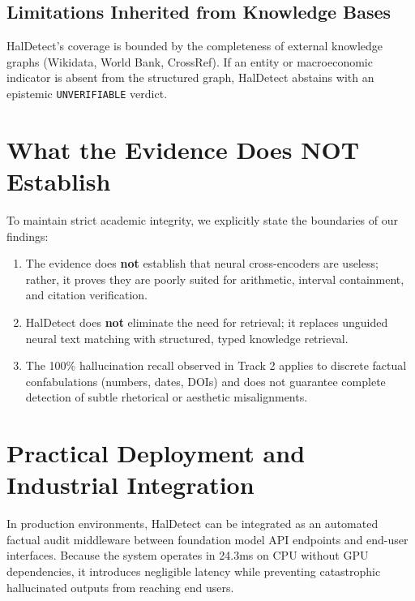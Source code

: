 \subsection{Limitations Inherited from Knowledge Bases}
HalDetect's coverage is bounded by the completeness of external knowledge graphs (Wikidata, World Bank, CrossRef). If an entity or macroeconomic indicator is absent from the structured graph, HalDetect abstains with an epistemic \texttt{UNVERIFIABLE} verdict.

\section{What the Evidence Does NOT Establish}
\label{sec:honest_bounds}

To maintain strict academic integrity, we explicitly state the boundaries of our findings:
\begin{enumerate}
    \item The evidence does \textbf{not} establish that neural cross-encoders are useless; rather, it proves they are poorly suited for arithmetic, interval containment, and citation verification.
    \item HalDetect does \textbf{not} eliminate the need for retrieval; it replaces unguided neural text matching with structured, typed knowledge retrieval.
    \item The 100\% hallucination recall observed in Track 2 applies to discrete factual confabulations (numbers, dates, DOIs) and does not guarantee complete detection of subtle rhetorical or aesthetic misalignments.
\end{enumerate}

\section{Practical Deployment and Industrial Integration}
\label{sec:practical_deployment}

In production environments, HalDetect can be integrated as an automated factual audit middleware between foundation model API endpoints and end-user interfaces. Because the system operates in 24.3ms on CPU without GPU dependencies, it introduces negligible latency while preventing catastrophic hallucinated outputs from reaching end users.
